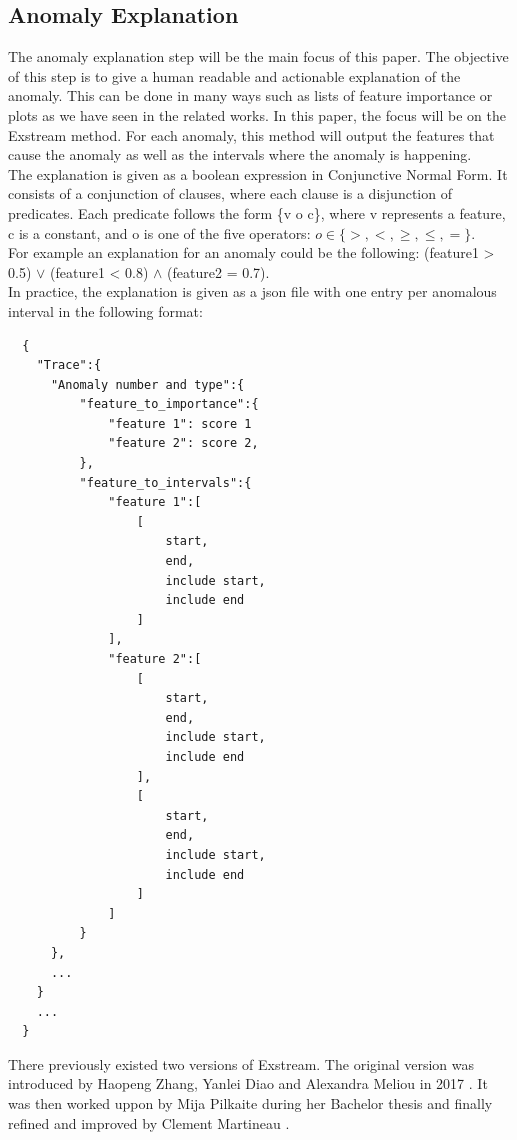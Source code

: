 \documentclass[oneside, a4paper, onecolumn, 11pt]{article}
\begin{document}
\subsection{Anomaly Explanation}
The anomaly explanation step will be the main focus of this paper. The objective of this step is to give a human readable and actionable explanation of the anomaly. This can be done in many ways such as lists of feature importance or plots as we have seen in the related works. In this paper, the focus will be on the Exstream method. For each anomaly, this method will output the features that cause the anomaly as well as the intervals where the anomaly is happening.\\
The explanation is given as a boolean expression in Conjunctive Normal Form. It consists of a conjunction of clauses, where each clause is a disjunction of predicates. Each predicate follows the form \{v o c\}, where v represents a feature, c is a constant, and o is one of the five operators: $o\in\{>, <, \geq, \leq, =\}$.\\
For example an explanation for an anomaly could be the following: (feature1 > 0.5) $\lor$ (feature1 < 0.8) $\land$ (feature2 = 0.7).\\
In practice, the explanation is given as a json file with one entry per anomalous interval in the following format:
\begin{verbatim}
  {
    "Trace":{
      "Anomaly number and type":{
          "feature_to_importance":{
              "feature 1": score 1
              "feature 2": score 2,
          },
          "feature_to_intervals":{
              "feature 1":[
                  [
                      start,
                      end,
                      include start,
                      include end
                  ]
              ],
              "feature 2":[
                  [
                      start,
                      end,
                      include start,
                      include end
                  ],
                  [
                      start,
                      end,
                      include start,
                      include end
                  ]
              ]
          }
      },
      ...
    }
    ...
  }
\end{verbatim}
\label{explanation_format}
There previously existed two versions of Exstream. The original version was introduced by Haopeng Zhang, Yanlei Diao and Alexandra Meliou  in 2017 \cite{Exstream}. It was then worked uppon by Mija Pilkaite during her Bachelor thesis \cite{MijaExstream} and finally refined and improved by Clement Martineau \cite{ClementExstream}.\\
\end{document}
